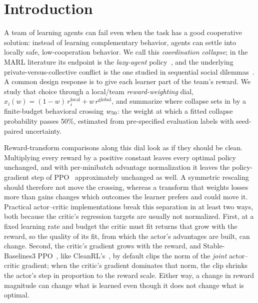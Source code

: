 
\section{Introduction}
\label{sec:intro}

A team of learning agents can fail even when the task has a good cooperative solution: instead of
learning complementary behavior, agents can settle into locally safe, low-cooperation behavior.
We call this \emph{coordination collapse};
in the MARL literature its endpoint is the \emph{lazy-agent}
policy~\citep{liu2023lazy,peng2023curo}, and the underlying private-versus-collective conflict is
the one studied in sequential social dilemmas~\citep{leibo2017multi}. A common design response is to give
each learner part of the team's reward. We study that choice through a local/team \emph{reward-weighting}
dial, $x_i(w)=(1-w)\,r_i^{\mathrm{local}}+w\,r^{\mathrm{global}}$, and summarize where collapse sets in by a
finite-budget behavioral crossing $w_{50}$: the weight at which a fitted collapse probability passes 50\%,
estimated from pre-specified evaluation labels with seed-paired uncertainty.

Reward-transform comparisons along this dial look as if they should be clean. Multiplying every reward by a
positive constant leaves every optimal policy unchanged, and with per-minibatch advantage normalization it
leaves the policy-gradient step of PPO~\citep{schulman2017ppo} approximately unchanged as well. A symmetric
rescaling should therefore not move the crossing, whereas a transform that weights losses more than gains
changes which outcomes the learner prefers and could move it. Practical actor--critic implementations break
this separation in at least two ways, both because the critic's regression targets are usually not normalized.
First, at a fixed learning rate and budget the critic must fit returns that grow with the reward, so the quality of
its fit, from which the actor's advantages are built, can change. Second, the critic's gradient grows with the
reward, and Stable-Baselines3 PPO~\citep{raffin2021sb3}, like CleanRL's~\citep{huang2022cleanrl}, by default clips
the norm of the \emph{joint} actor--critic gradient; when the critic's gradient dominates that norm, the clip shrinks
the actor's step in proportion to the reward scale. Either way, a change in reward magnitude can change what is
learned even though it does not change what is optimal.

